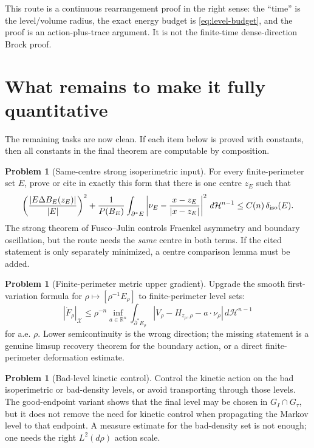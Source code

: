 \documentclass[11pt]{article}
\theoremstyle{definition}
\newtheorem{problem}[theorem]{Problem}
\newcommand{\R}{\mathbb R}
\newcommand{\HH}{\mathcal H}
\newcommand{\X}{\mathcal X}
\begin{document}
This route is a continuous rearrangement proof in the right sense: the
``time'' is the level/volume radius, the exact energy budget is
\eqref{eq:level-budget}, and the proof is an action-plus-trace argument.
It is not the finite-time dense-direction Brock proof.

\section{What remains to make it fully quantitative}

The remaining tasks are now clean.  If each item below is proved with
constants, then all constants in the final theorem are computable by
composition.

\begin{problem}[Same-centre strong isoperimetric input]\label{prob:same-centre}
For every finite-perimeter set \(E\), prove or cite in exactly this
form that there is one centre \(z_E\) such that
\[
   \left(\frac{|E\Delta B_E(z_E)|}{|E|}\right)^2
   +
   \frac{1}{P(B_E)}
   \int_{\partial^*E}
   \left|\nu_E-\frac{x-z_E}{|x-z_E|}\right|^2\,d\HH^{n-1}
   \le C(n)\,\delta_{\rm iso}(E).
\]
The strong theorem of Fusco--Julin controls Fraenkel asymmetry and
boundary oscillation, but the route needs the \emph{same} centre in both
terms.  If the cited statement is only separately minimized, a centre
comparison lemma must be added.
\end{problem}

\begin{problem}[Finite-perimeter metric upper gradient]\label{prob:UG}
Upgrade the smooth first-variation formula for
\(\rho\mapsto [\rho^{-1}E_\rho]\) to finite-perimeter level sets:
\[
   |\dot F_\rho|_\X
   \le
   \rho^{-n}\inf_{a\in\R^n}
   \int_{\partial^*E_\rho}
   |V_\rho-H_{z_\rho,\rho}-a\cdot\nu_\rho|\,d\HH^{n-1}
\]
for a.e. \(\rho\).  Lower semicontinuity is the wrong direction; the
missing statement is a genuine limsup recovery theorem for the boundary
action, or a direct finite-perimeter deformation estimate.
\end{problem}

\begin{problem}[Bad-level kinetic control]\label{prob:bad}
Control the kinetic action on the bad isoperimetric or bad-density
levels, or avoid transporting through those levels.  The good-endpoint
variant shows that the final level may be chosen in
\(G_I\cap G_\tau\), but it does not remove the need for kinetic control
when propagating the Markov level to that endpoint.  A measure estimate
for the bad-density set is not enough; one needs the right \(L^2(d\rho)\)
action scale.
\end{problem}
\end{document}
